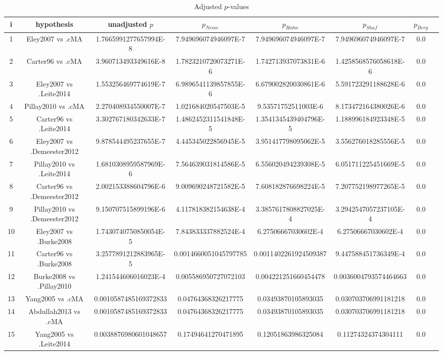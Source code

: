 \documentclass[a4paper,10pt]{article}
\begin{document}
\begin{landscape}
\begin{table}[!htp]
\centering\tiny
\caption{Adjusted $p$-values}
\begin{tabular}{cccccccc}
i&hypothesis&unadjusted $p$&$p_{Neme}$&$p_{Holm}$&$p_{Shaf}$&$p_{Berg}$\\
\hline
1&Eley2007 vs .cMA&1.7665991277657994E-8&7.949696074946097E-7&7.949696074946097E-7&7.949696074946097E-7&0.0\\
2&Carter96 vs .cMA&3.960713493349616E-8&1.7823210720073271E-6&1.742713937073831E-6&1.4258568576058618E-6&0.0\\
3&Eley2007 vs .Leite2014&1.553256469774619E-7&6.9896541139857855E-6&6.679002820030861E-6&5.591723291188628E-6&0.0\\
4&Pillay2010 vs .cMA&2.270408934550007E-7&1.021684020547503E-5&9.53571752511003E-6&8.173472164380026E-6&0.0\\
5&Carter96 vs .Leite2014&3.302767180342633E-7&1.4862452311541848E-5&1.3541345439404796E-5&1.188996184923348E-5&0.0\\
6&Eley2007 vs .Demeester2012&9.878544495237655E-7&4.445345022856945E-5&3.951417798095062E-5&3.556276018285556E-5&0.0\\
7&Pillay2010 vs .Leite2014&1.6810308959587969E-6&7.564639031814586E-5&6.556020494239308E-5&6.051711225451669E-5&0.0\\
8&Carter96 vs .Demeester2012&2.002153388604796E-6&9.009690248721582E-5&7.608182876698224E-5&7.207752198977265E-5&0.0\\
9&Pillay2010 vs .Demeester2012&9.150707515899196E-6&4.117818382154638E-4&3.3857617808827025E-4&3.2942547057237105E-4&0.0\\
10&Eley2007 vs .Burke2008&1.7430740750850054E-5&7.843833337882524E-4&6.27506667030602E-4&6.27506667030602E-4&0.0\\
11&Carter96 vs .Burke2008&3.2577891212883965E-5&0.0014660051045797785&0.0011402261924509387&9.447588451736349E-4&0.0\\
12&Burke2008 vs .Pillay2010&1.241544606016023E-4&0.005586950727072103&0.004221251660454478&0.0036004793574464663&0.0\\
13&Yang2005 vs .cMA&0.0010587485169372833&0.04764368326217775&0.03493870105893035&0.030703706991181218&0.0\\
14&Abdullah2013 vs .cMA&0.0010587485169372833&0.04764368326217775&0.03493870105893035&0.030703706991181218&0.0\\
15&Yang2005 vs .Leite2014&0.0038876980601048657&0.17494641270471895&0.12051863986325084&0.11274324374304111&0.0\\

\end{tabular}
\end{table}
\end{landscape}
\end{document}
